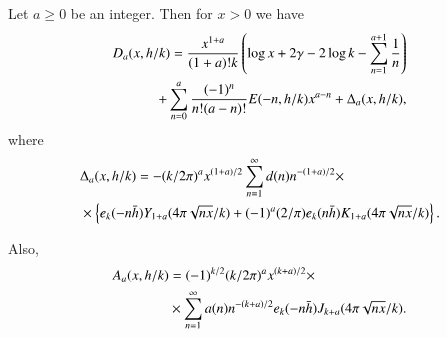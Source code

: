 \begin{THM}\label{chap1:thm1.3}
Let $a\geq 0$ be an integer. Then for $x>0$ we have
\begin{align}
D_a(x,h/k)= \frac{x^{1+a}}{(1+a)!k}\left(\log
x+2\gamma-2\log k-\sum\limits_{n=1}^{a+1}\frac{1}{n}
\right)\label{chap1:eq1.6.3}\\
+\sum\limits_{n=0}^a\frac{(-1)^n}{n!(a-n)!}E(-n,h/k)x^{a-n}+\Delta_a
(x,h/k),\notag 
\end{align}
where
\begin{align}
& \Delta_a(x,h/k)=-(k/2\pi)^ax^{(1+a)/2}\sum\limits_{n=1}^\infty d(n)
n^{-(1+a)/2}\times\label{chap1:eq1.6.4}\\
& \times \left\{e_k(-n\bar{h})Y_{1+a}(4\pi\sqrt{nx}/k)+(-1)^a(2/\pi)e_k
(n\bar{h})K_{1+a}(4\pi\sqrt{nx}/k)\right\}.\notag
\end{align}

Also,\pageoriginale
\begin{align}
A_a(x,h/k) &= (-1)^{k/2}(k/2\pi)^ax^{(k+a)/2}
\times\label{chap1:eq1.6.5}\\
&\times \sum\limits_{n=1}^\infty a(n)n^{-(k+a)/2}e_k(-n\bar{h})
J_{k+a}(4\pi\sqrt{nx}/k).\notag
\end{align}
\end{THM}

